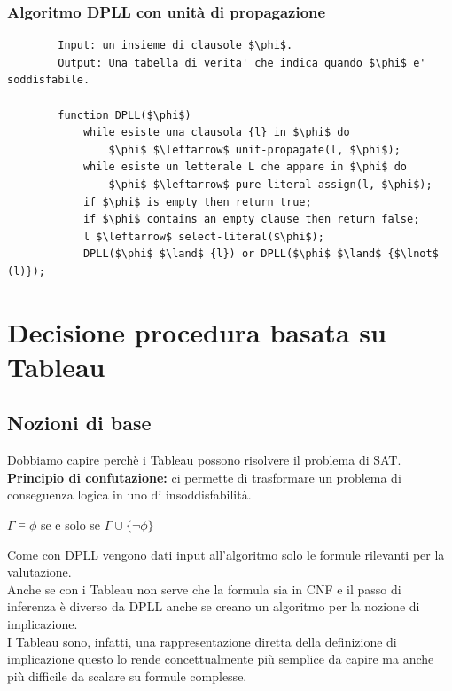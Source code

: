 \documentclass[../main.tex]{subfiles}
\begin{document}
    \subsection{Algoritmo DPLL con unità di propagazione}
    \begin{lstlisting}
        Input: un insieme di clausole $\phi$.
        Output: Una tabella di verita' che indica quando $\phi$ e' soddisfabile.

        function DPLL($\phi$)
            while esiste una clausola {l} in $\phi$ do
                $\phi$ $\leftarrow$ unit-propagate(l, $\phi$);
            while esiste un letterale L che appare in $\phi$ do
                $\phi$ $\leftarrow$ pure-literal-assign(l, $\phi$);
            if $\phi$ is empty then return true;
            if $\phi$ contains an empty clause then return false;
            l $\leftarrow$ select-literal($\phi$);
            DPLL($\phi$ $\land$ {l}) or DPLL($\phi$ $\land$ {$\lnot$ (l)});
    \end{lstlisting}

    \chapter{Decisione procedura basata su Tableau}
    \section{Nozioni di base}
    Dobbiamo capire perchè i Tableau possono risolvere il problema di SAT.\\
    \textbf{Principio di confutazione:} ci permette di trasformare un problema di conseguenza logica in uno di insoddisfabilità.
    \begin{center}
        $\Gamma \models \phi$ se e solo se $\Gamma \cup \{ \lnot \phi \}$
    \end{center}
    Come con DPLL vengono dati input all'algoritmo solo le formule rilevanti per la valutazione.\\
    Anche se con i Tableau non serve che la formula sia in CNF e il passo di inferenza è diverso da DPLL anche se creano un algoritmo per la nozione di implicazione.\\
    I Tableau sono, infatti, una rappresentazione diretta della definizione di implicazione questo lo rende concettualmente più semplice da capire ma anche più difficile da scalare su formule complesse.
\end{document}
